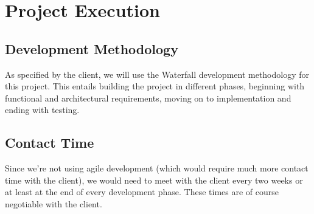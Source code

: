 \documentclass[12pt]{article}
\begin{document}


\newpage
\tableofcontents

\newpage



\newpage

\section{Project Execution}

\subsection{Development Methodology}
As specified by the client, we will use the Waterfall development methodology for this project. This entails building the project in different phases, beginning with functional and architectural requirements, moving on to implementation and ending with testing.

\subsection{Contact Time}
Since we're not using agile development (which would require much more contact time with the client), we would need to meet with the client every two weeks or at least at the end of every development phase. These times are of course negotiable with the client.

\subsection{}
 
\end{document}
